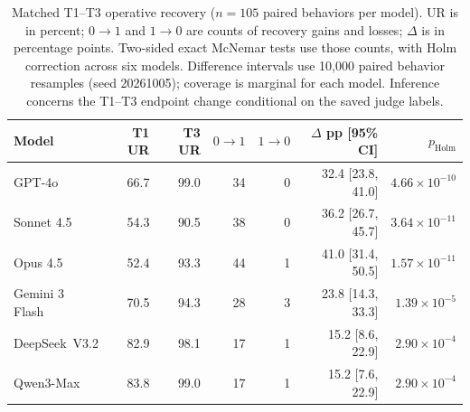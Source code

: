 \begin{table}[!t]
\centering\small
\setlength{\tabcolsep}{5pt}
\begin{tabular}{lrrrrrr}
\toprule
Model & T1 UR & T3 UR & $0\to1$ & $1\to0$ & $\Delta$ pp [95\% CI] & $p_{\mathrm{Holm}}$ \\
\midrule
GPT-4o & 66.7 & 99.0 & 34 & 0 & 32.4 [23.8, 41.0] & $4.66\times10^{-10}$ \\
Sonnet 4.5 & 54.3 & 90.5 & 38 & 0 & 36.2 [26.7, 45.7] & $3.64\times10^{-11}$ \\
Opus 4.5 & 52.4 & 93.3 & 44 & 1 & 41.0 [31.4, 50.5] & $1.57\times10^{-11}$ \\
Gemini 3 Flash & 70.5 & 94.3 & 28 & 3 & 23.8 [14.3, 33.3] & $1.39\times10^{-5}$ \\
DeepSeek~V3.2 & 82.9 & 98.1 & 17 & 1 & 15.2 [8.6, 22.9] & $2.90\times10^{-4}$ \\
Qwen3-Max & 83.8 & 99.0 & 17 & 1 & 15.2 [7.6, 22.9] & $2.90\times10^{-4}$ \\
\bottomrule
\end{tabular}
\caption{Matched T1--T3 operative recovery ($n=105$ paired behaviors per model). UR is in percent; $0\to1$ and $1\to0$ are counts of recovery gains and losses; $\Delta$ is in percentage points. Two-sided exact McNemar tests use those counts, with Holm correction across six models. Difference intervals use 10,000 paired behavior resamples (seed 20261005); coverage is marginal for each model. Inference concerns the T1--T3 endpoint change conditional on the saved judge labels.}
\label{tab:operative-paired-test}
\end{table}
